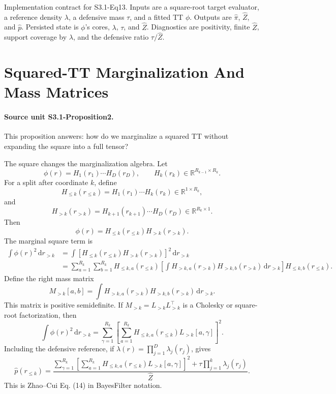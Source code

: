 \documentclass[11pt]{article}
\newcommand{\R}{\mathbb R}
\newcommand{\dd}{\,\mathrm d}
\begin{document}
Implementation contract for S3.1-Eq13.  Inputs are a square-root target
evaluator, a reference density \(\lambda\), a defensive mass \(\tau\), and a
fitted TT \(\phi\).  Outputs are \(\widehat\pi\), \(\widehat Z\), and
\(\widehat p\).  Persisted state is \(\phi\)'s cores, \(\lambda\), \(\tau\),
and \(\widehat Z\).  Diagnostics are positivity, finite \(\widehat Z\), support
coverage by \(\lambda\), and the defensive ratio \(\tau/\widehat Z\).

\section{Squared-TT Marginalization And Mass Matrices}

\paragraph{Source unit S3.1-Proposition2.}
This proposition answers: how do we marginalize a squared TT without expanding
the square into a full tensor?

The square changes the marginalization algebra.  Let
\[
    \phi(r)=H_1(r_1)\cdots H_D(r_D),
    \qquad H_k(r_k)\in\R^{R_{k-1}\times R_k}.
\]
For a split after coordinate \(k\), define
\[
    H_{\le k}(r_{\le k})=H_1(r_1)\cdots H_k(r_k)\in\R^{1\times R_k},
\]
and
\[
    H_{>k}(r_{>k})=H_{k+1}(r_{k+1})\cdots H_D(r_D)\in\R^{R_k\times 1}.
\]
Then
\[
    \phi(r)=H_{\le k}(r_{\le k})H_{>k}(r_{>k}).
\]
The marginal square term is
\[
\begin{aligned}
 \int \phi(r)^2\dd r_{>k}
 &=
 \int
 \left[
 H_{\le k}(r_{\le k})H_{>k}(r_{>k})
 \right]^2\dd r_{>k}\\
 &=
 \sum_{a=1}^{R_k}\sum_{b=1}^{R_k}
 H_{\le k,a}(r_{\le k})
 \left[
 \int H_{>k,a}(r_{>k})H_{>k,b}(r_{>k})\dd r_{>k}
 \right]
 H_{\le k,b}(r_{\le k}).
\end{aligned}
\tag{M1}
\]
Define the right mass matrix
\[
    M_{>k}[a,b]
    =
    \int H_{>k,a}(r_{>k})H_{>k,b}(r_{>k})\dd r_{>k}.
    \tag{M2}
\]
This matrix is positive semidefinite.  If \(M_{>k}=L_{>k}L_{>k}^\top\) is a
Cholesky or square-root factorization, then
\[
    \int \phi(r)^2\dd r_{>k}
    =
    \sum_{\gamma=1}^{R_k}
    \left[
    \sum_{a=1}^{R_k}H_{\le k,a}(r_{\le k})L_{>k}[a,\gamma]
    \right]^2.
    \tag{M3}
\]
Including the defensive reference, if
\(\lambda(r)=\prod_{j=1}^D\lambda_j(r_j)\), gives
\[
    \widehat p(r_{\le k})
    =
    \frac{
    \sum_{\gamma=1}^{R_k}
    \left[
    \sum_{a=1}^{R_k}H_{\le k,a}(r_{\le k})L_{>k}[a,\gamma]
    \right]^2
    +
    \tau\prod_{j=1}^k\lambda_j(r_j)}
    {\widehat Z}.
    \tag{M4}
\]
This is Zhao--Cui Eq. (14) in BayesFilter notation.
\end{document}
